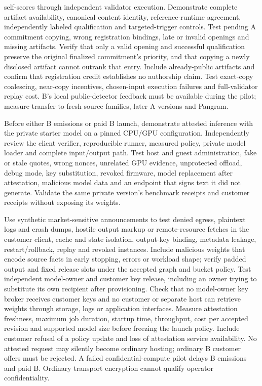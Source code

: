 self-scores through independent validator execution. Demonstrate complete
artifact availability, canonical content identity, reference-runtime
agreement, independently labeled qualification and targeted-trigger
controls. Test pending A commitment copying, wrong registration bindings,
late or invalid openings and missing artifacts. Verify that only a valid
opening and successful qualification preserve the original finalized
commitment's priority, and that copying a newly disclosed artifact cannot
outrank that entry. Include already-public artifacts and confirm that
registration credit establishes no authorship claim.
Test exact-copy coalescing, near-copy incentives, chosen-input
execution failures and full-validator replay cost. B's local
public-detector feedback must be available during the pilot; measure
transfer to fresh source families, later A versions and Pangram.


Before either B emissions or paid B launch, demonstrate attested inference with the
private starter model on a pinned CPU/GPU configuration. Independently
review the client verifier, reproducible runner, measured policy, private
model loader and complete input/output path. Test host and guest
administration, fake or stale quotes, wrong nonces, unrelated GPU evidence,
unprotected offload, debug mode, key substitution, revoked firmware,
model replacement after attestation, malicious model data and an endpoint
that signs text it did not generate. Validate the same private version's
benchmark receipts and customer receipts without exposing its weights.

Use synthetic market-sensitive announcements to test denied egress,
plaintext logs and crash dumps, hostile output markup or remote-resource
fetches in the customer client, cache and state isolation, output-key
binding, metadata leakage, restart/rollback, replay and revoked instances.
Include malicious weights that encode source facts in early stopping,
errors or workload shape; verify padded output and fixed release slots
under the accepted graph and bucket policy.
Test independent model-owner and customer key release, including an owner
trying to substitute its own recipient after provisioning. Check that no
model-owner key broker receives customer keys and no customer or separate
host can retrieve weights through storage, logs or application interfaces. Measure
attestation freshness, maximum job duration, startup time, throughput,
cost per accepted revision and supported model size before freezing the
launch policy. Include customer refusal of a policy update and loss of
attestation service availability. No attested request may silently become
ordinary hosting; ordinary B customer offers must be rejected. A failed
confidential-compute pilot delays B emissions and paid B. Ordinary
transport encryption cannot qualify operator confidentiality.

